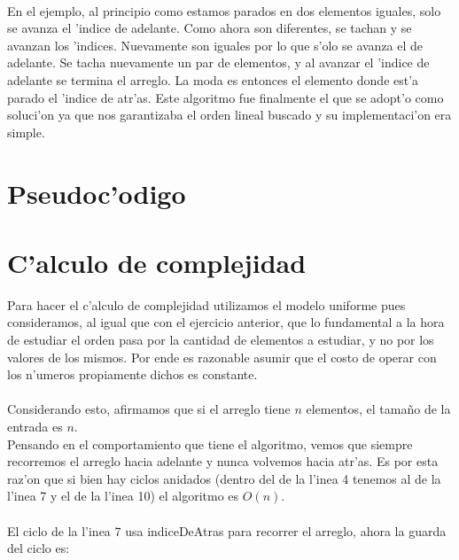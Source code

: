 \paragraph{}
En el ejemplo, al principio como estamos parados en dos elementos iguales, solo se avanza el 'indice de adelante. 
Como ahora son diferentes, se tachan y se avanzan los 'indices. Nuevamente son iguales por lo que s'olo 
se avanza el de adelante. Se tacha nuevamente un par de elementos, y al avanzar el 'indice de adelante se 
termina el arreglo. La moda es entonces el elemento donde est'a parado el 'indice de atr'as.
Este algoritmo fue finalmente el que se adopt'o como soluci'on ya que nos garantizaba el orden lineal 
buscado y su implementaci'on era simple.

\newpage
\section{Pseudoc'odigo}


\newpage
\section{C'alculo de complejidad}
Para hacer el c'alculo de complejidad utilizamos el modelo uniforme pues consideramos, al igual que con 
el ejercicio anterior, que lo fundamental a la hora de estudiar el orden pasa por la cantidad de elementos 
a estudiar, y no por los valores de los mismos. Por ende es razonable asumir que el costo de operar
con los n'umeros propiamente dichos es constante.\\
\paragraph{}
Considerando esto, afirmamos que si el arreglo tiene $n$ elementos, el tama\~{n}o de la entrada es $n$.\\
Pensando en el comportamiento que tiene el algoritmo, vemos que siempre recorremos el arreglo hacia adelante 
y nunca volvemos hacia atr'as. Es por esta raz'on que si bien hay ciclos anidados (dentro del de la l'inea 
4 tenemos al de la l'inea 7 y el de la l'inea 10) el algoritmo es $O(n)$.
\paragraph{}
El ciclo de la l'inea 7 usa indiceDeAtras para recorrer el arreglo, ahora la guarda del ciclo es:\\

